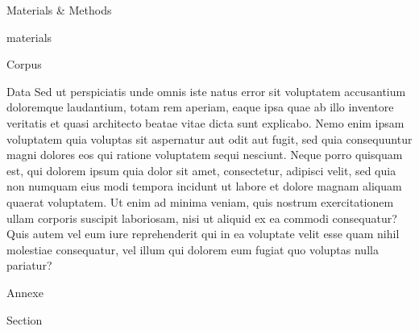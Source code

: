 \documentclass[french, english]{mythesis}
\begin{document}
\begin{mychapter}{Materials \& Methods}
\begin{mysection}{materials}
\begin{mysubsection}{Corpus}
	\end{mysubsection}
	\begin{mysubsection}{Data}
		Sed ut perspiciatis unde omnis iste natus error sit voluptatem accusantium doloremque laudantium, totam rem aperiam, eaque ipsa quae ab illo inventore veritatis et quasi architecto beatae vitae dicta sunt explicabo. Nemo enim ipsam voluptatem quia voluptas sit aspernatur aut odit aut fugit, sed quia consequuntur magni dolores eos qui ratione voluptatem sequi nesciunt. Neque porro quisquam est, qui dolorem ipsum quia dolor sit amet, consectetur, adipisci velit, sed quia non numquam eius modi tempora incidunt ut labore et dolore magnam aliquam quaerat voluptatem. Ut enim ad minima veniam, quis nostrum exercitationem ullam corporis suscipit laboriosam, nisi ut aliquid ex ea commodi consequatur? Quis autem vel eum iure reprehenderit qui in ea voluptate velit esse quam nihil molestiae consequatur, vel illum qui dolorem eum fugiat quo voluptas nulla pariatur?
	\end{mysubsection}
	\end{mysection}
 
	\end{mychapter}
	


	
%	
%	
%	





	\myappendix
	\begin{mychapter+}{Annexe}
	
	\begin{mysection+}{Section}
	\end{mysection+}
	
	\end{mychapter+}

\myglossary


\mybiblio
	
\end{document}
